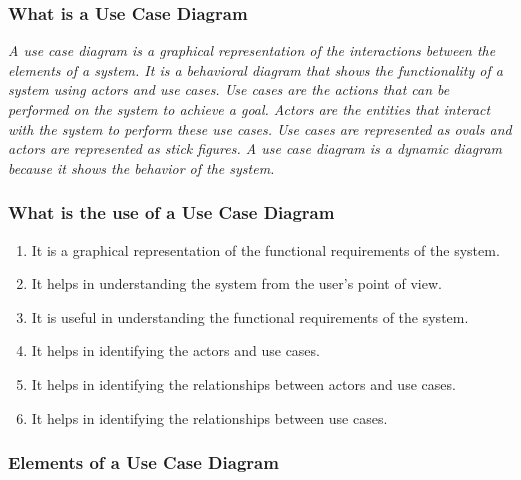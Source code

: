 \documentclass[11pt]{article}
\begin{document}
\subsubsection{What is a Use Case Diagram}

\textit{A use case diagram is a graphical representation of the interactions between the elements of a system. It is a behavioral diagram that shows the functionality of a system using actors and use cases. Use cases are the actions that can be performed on the system to achieve a goal. Actors are the entities that interact with the system to perform these use cases. Use cases are represented as ovals and actors are represented as stick figures. A use case diagram is a dynamic diagram because it shows the behavior of the system.}

\subsubsection{What is the use of a Use Case Diagram}

\begin{enumerate}
	\item It is a graphical representation of the functional requirements of the system.
	\item It helps in understanding the system from the user's point of view.
	\item It is useful in understanding the functional requirements of the system.
	\item It helps in identifying the actors and use cases.
	\item It helps in identifying the relationships between actors and use cases.
	\item It helps in identifying the relationships between use cases.
\end{enumerate}

\subsubsection{Elements of a Use Case Diagram}
\end{document}

